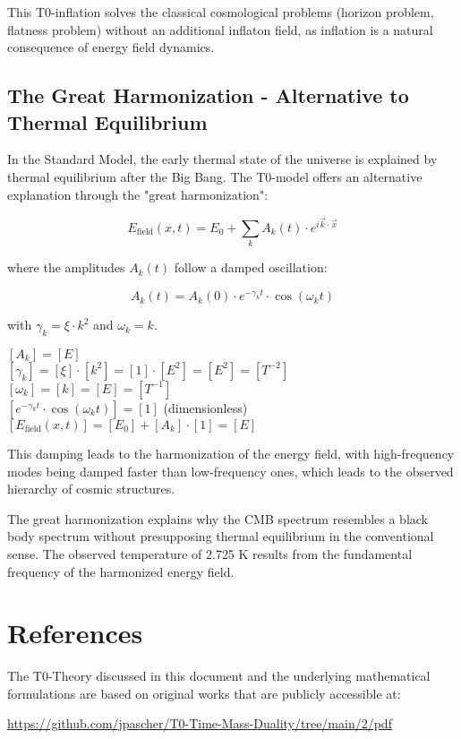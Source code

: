 \documentclass[12pt,a4paper]{article}
\theoremstyle{definition}
\begin{document}
	This T0-inflation solves the classical cosmological problems (horizon problem, flatness problem) without an additional inflaton field, as inflation is a natural consequence of energy field dynamics.
	
	\subsection{The Great Harmonization - Alternative to Thermal Equilibrium}
	
	In the Standard Model, the early thermal state of the universe is explained by thermal equilibrium after the Big Bang. The T0-model offers an alternative explanation through the "great harmonization":
	
	\begin{equation}
		E_{\text{field}}(x,t) = E_0 + \sum_k A_k(t) \cdot e^{i\vec{k}\cdot\vec{x}}
	\end{equation}
	
	where the amplitudes $A_k(t)$ follow a damped oscillation:
	
	\begin{equation}
		A_k(t) = A_k(0) \cdot e^{-\gamma_k t} \cdot \cos(\omega_k t)
	\end{equation}
	
	with $\gamma_k = \xi \cdot k^2$ and $\omega_k = k$.
	
	\begin{einheitencheck}
		$[A_k] = [E]$ \checkmark\\
		$[\gamma_k] = [\xi] \cdot [k^2] = [1] \cdot [E^2] = [E^2] = [T^{-2}]$ \checkmark\\
		$[\omega_k] = [k] = [E] = [T^{-1}]$ \checkmark\\
		$[e^{-\gamma_k t} \cdot \cos(\omega_k t)] = [1]$ (dimensionless) \checkmark\\
		$[E_{\text{field}}(x,t)] = [E_0] + [A_k] \cdot [1] = [E]$ \checkmark
	\end{einheitencheck}
	
	This damping leads to the harmonization of the energy field, with high-frequency modes being damped faster than low-frequency ones, which leads to the observed hierarchy of cosmic structures.
	
	\begin{wichtig}
		The great harmonization explains why the CMB spectrum resembles a black body spectrum without presupposing thermal equilibrium in the conventional sense. The observed temperature of 2.725 K results from the fundamental frequency of the harmonized energy field.
	\end{wichtig}
	\section{References}
	
	The T0-Theory discussed in this document and the underlying mathematical formulations are based on original works that are publicly accessible at:
	
	\begin{center}
		\url{https://github.com/jpascher/T0-Time-Mass-Duality/tree/main/2/pdf}
	\end{center}	
\end{document}
